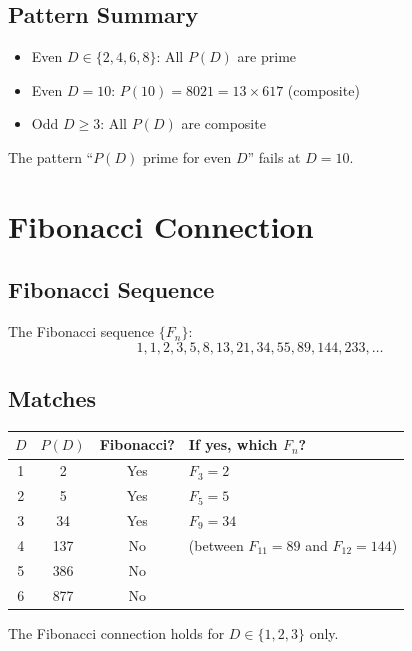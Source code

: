 \documentclass[11pt,a4paper]{article}
\begin{document}
\subsection{Pattern Summary}

\begin{itemize}
    \item Even $D \in \{2, 4, 6, 8\}$: All $P(D)$ are prime
    \item Even $D = 10$: $P(10) = 8021 = 13 \times 617$ (composite)
    \item Odd $D \geq 3$: All $P(D)$ are composite
\end{itemize}

The pattern ``$P(D)$ prime for even $D$'' fails at $D = 10$.

\section{Fibonacci Connection}

\subsection{Fibonacci Sequence}

The Fibonacci sequence $\{F_n\}$:
\[
1, 1, 2, 3, 5, 8, 13, 21, 34, 55, 89, 144, 233, \ldots
\]

\subsection{Matches}

\begin{center}
\begin{tabular}{|c|c|c|l|}
\hline
$D$ & $P(D)$ & Fibonacci? & If yes, which $F_n$? \\
\hline
1 & 2 & Yes & $F_3 = 2$ \\
2 & 5 & Yes & $F_5 = 5$ \\
3 & 34 & Yes & $F_9 = 34$ \\
4 & 137 & No & (between $F_{11}=89$ and $F_{12}=144$) \\
5 & 386 & No & \\
6 & 877 & No & \\
\hline
\end{tabular}
\end{center}

The Fibonacci connection holds for $D \in \{1, 2, 3\}$ only.
\end{document}
